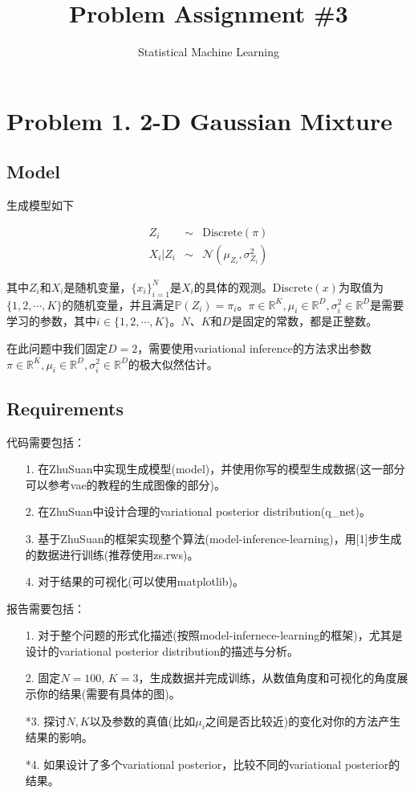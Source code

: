 \documentclass{article}
\title{Problem Assignment \#3}
\author{Statistical Machine Learning}
\date{}
\begin{document}
\maketitle

\section{Problem 1. 2-D Gaussian Mixture}

\subsection{Model}

生成模型如下

\begin{eqnarray}
	Z_i &\sim& \mathrm{Discrete}(\pi) \\
	X_i \lvert Z_i &\sim& \mathcal{N}(\mu_{Z_i}, \sigma^2_{Z_i})
\end{eqnarray}

其中$Z_i$和$X_i$是随机变量，$\{x_i\}_{i=1}^N$是$X_i$的具体的观测。$\mathrm{Discrete}(x)$为取值为$\{1,2,\cdots,K\}$的随机变量，并且满足$\mathbb{P}(Z_i)=\pi_i$。$\pi \in \mathbb{R}^K, \mu_i \in \mathbb{R}^D, \sigma^2_i \in \mathbb{R}^D$是需要学习的参数，其中$i \in \{1, 2, \cdots, K\}$。$N$、$K$和$D$是固定的常数，都是正整数。

在此问题中我们固定$D=2$，需要使用variational inference的方法求出参数$\pi \in \mathbb{R}^K, \mu_i \in \mathbb{R}^D, \sigma^2_i \in \mathbb{R}^D$的极大似然估计。

\subsection{Requirements}

代码需要包括：

\begin{itemize}
	\item [1.] 在ZhuSuan中实现生成模型(model)，并使用你写的模型生成数据(这一部分可以参考vae的教程的生成图像的部分)。
	\item [2.] 在ZhuSuan中设计合理的variational posterior distribution(q\_net)。
	\item [3.] 基于ZhuSuan的框架实现整个算法(model-inference-learning)，用[1]步生成的数据进行训练(推荐使用zs.rws)。
	\item [4.] 对于结果的可视化(可以使用matplotlib)。
\end{itemize}

报告需要包括：

\begin{itemize}
	\item [1.] 对于整个问题的形式化描述(按照model-infernece-learning的框架)，尤其是设计的variational posterior distribution的描述与分析。
	\item [2.] 固定$N=100$, $K=3$，生成数据并完成训练，从数值角度和可视化的角度展示你的结果(需要有具体的图)。
	\item [*3.] 探讨$N, K$以及参数的真值(比如$\mu_i$之间是否比较近)的变化对你的方法产生结果的影响。
	\item [*4.] 如果设计了多个variational posterior，比较不同的variational posterior的结果。
\end{itemize}
\end{document}
